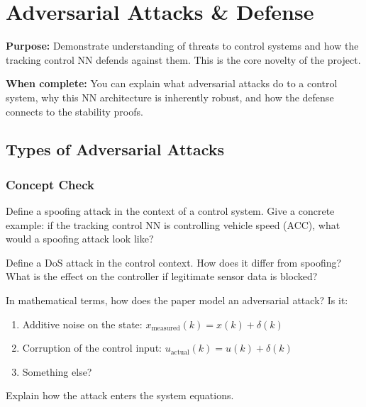 \section{Adversarial Attacks \& Defense}

\begin{purposebox}
\textbf{Purpose:} Demonstrate understanding of threats to control systems and how the tracking control NN defends against them. This is the core novelty of the project.

\textbf{When complete:} You can explain what adversarial attacks do to a control system, why this NN architecture is inherently robust, and how the defense connects to the stability proofs.
\end{purposebox}

\subsection{Types of Adversarial Attacks}

\subsubsection*{Concept Check}

Define a spoofing attack in the context of a control system. Give a concrete example: if the tracking control NN is controlling vehicle speed (ACC), what would a spoofing attack look like?

\begin{answerbox}\end{answerbox}

Define a DoS attack in the control context. How does it differ from spoofing? What is the effect on the controller if legitimate sensor data is blocked?

\begin{answerbox}\end{answerbox}

In mathematical terms, how does the paper model an adversarial attack? Is it:
\begin{enumerate}[nosep, label=(\alph*)]
  \item Additive noise on the state: $x_{\text{measured}}(k) = x(k) + \delta(k)$
  \item Corruption of the control input: $u_{\text{actual}}(k) = u(k) + \delta(k)$
  \item Something else?
\end{enumerate}
Explain how the attack enters the system equations.

